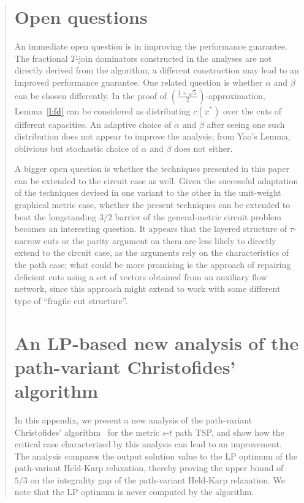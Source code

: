 \documentclass[11pt,letterpaper]{article}
\newcommand{\st}{\mbox{$s$-$t$} }
\begin{document}
\begin{quote}
\section{Open questions}\label{s:oq}

An immediate open question is in improving the performance guarantee. The fractional $T$-join dominators constructed in the analyses are not directly derived from the algorithm; a different construction may lead to an improved performance guarantee. One related question is whether $\alpha$ and $\beta$ can be chosen differently. In the proof of $\left(\frac{1+\sqrt{5}}{2}\right)$-approximation, Lemma~\ref{l:fd} can be considered as distributing $c(x^*)$ over the cuts of different capacities. An adaptive choice of $\alpha$ and $\beta$ after seeing one such distribution does not appear to improve the analysis; from Yao's Lemma, oblivious but stochastic choice of $\alpha$ and $\beta$ does not either.

A bigger open question is whether the techniques presented in this paper can be extended to the circuit case as well. Given the successful adaptation of the techniques devised in one variant to the other in the unit-weight graphical metric case, whether the present techniques can be extended to beat the longstanding $3/2$ barrier of the general-metric circuit problem becomes an interesting question. It appears that the layered structure of $\tau$-narrow cuts or the parity argument on them are less likely to directly extend to the circuit case, as the arguments rely on the characteristics of the path case; what could be more promising is the approach of repairing deficient cuts using a set of vectors obtained from an auxiliary flow network, since this approach might extend to work with some different type of ``fragile cut structure''.



\appendix

\section{An LP-based new analysis of the path-variant Christofides' algorithm}\label{ap:c53}

In this appendix, we present a new analysis of the path-variant Christofides' algorithm~\cite{C, H} for the metric \st path TSP, and show how the critical case characterized by this analysis can lead to an improvement. The analysis compares the output solution value to the LP optimum of the path-variant Held-Karp relaxation, thereby proving the upper bound of $5/3$ on the integrality gap of the path-variant Held-Karp relaxation. We note that the LP optimum is never computed by the algorithm.


\end{quote}
\end{document}
